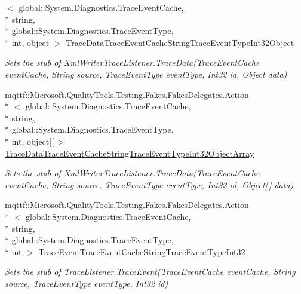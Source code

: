 \begin{DoxyCompactItemize}
$<$ global\-::\-System.\-Diagnostics.\-Trace\-Event\-Cache, \\*
string, \\*
global\-::\-System.\-Diagnostics.\-Trace\-Event\-Type, \\*
int, object $>$ \hyperlink{class_system_1_1_diagnostics_1_1_fakes_1_1_stub_xml_writer_trace_listener_a1284b8f36f6d91e77618cf6c9c6b7f00}{Trace\-Data\-Trace\-Event\-Cache\-String\-Trace\-Event\-Type\-Int32\-Object}
\begin{DoxyCompactList}\small\item\em Sets the stub of Xml\-Writer\-Trace\-Listener.\-Trace\-Data(\-Trace\-Event\-Cache event\-Cache, String source, Trace\-Event\-Type event\-Type, Int32 id, Object data)\end{DoxyCompactList}\item 
mqttf\-::\-Microsoft.\-Quality\-Tools.\-Testing.\-Fakes.\-Fakes\-Delegates.\-Action\\*
$<$ global\-::\-System.\-Diagnostics.\-Trace\-Event\-Cache, \\*
string, \\*
global\-::\-System.\-Diagnostics.\-Trace\-Event\-Type, \\*
int, object\mbox{[}$\,$\mbox{]}$>$ \hyperlink{class_system_1_1_diagnostics_1_1_fakes_1_1_stub_xml_writer_trace_listener_a5be8adbad8748260f3e6197d0e0958e7}{Trace\-Data\-Trace\-Event\-Cache\-String\-Trace\-Event\-Type\-Int32\-Object\-Array}
\begin{DoxyCompactList}\small\item\em Sets the stub of Xml\-Writer\-Trace\-Listener.\-Trace\-Data(\-Trace\-Event\-Cache event\-Cache, String source, Trace\-Event\-Type event\-Type, Int32 id, Object\mbox{[}$\,$\mbox{]} data)\end{DoxyCompactList}\item 
mqttf\-::\-Microsoft.\-Quality\-Tools.\-Testing.\-Fakes.\-Fakes\-Delegates.\-Action\\*
$<$ global\-::\-System.\-Diagnostics.\-Trace\-Event\-Cache, \\*
string, \\*
global\-::\-System.\-Diagnostics.\-Trace\-Event\-Type, \\*
int $>$ \hyperlink{class_system_1_1_diagnostics_1_1_fakes_1_1_stub_xml_writer_trace_listener_a1a4d963b7e4f01c1488c18f3c623514e}{Trace\-Event\-Trace\-Event\-Cache\-String\-Trace\-Event\-Type\-Int32}
\begin{DoxyCompactList}\small\item\em Sets the stub of Trace\-Listener.\-Trace\-Event(\-Trace\-Event\-Cache event\-Cache, String source, Trace\-Event\-Type event\-Type, Int32 id)\end{DoxyCompactList}\item 

\end{DoxyCompactItemize}
